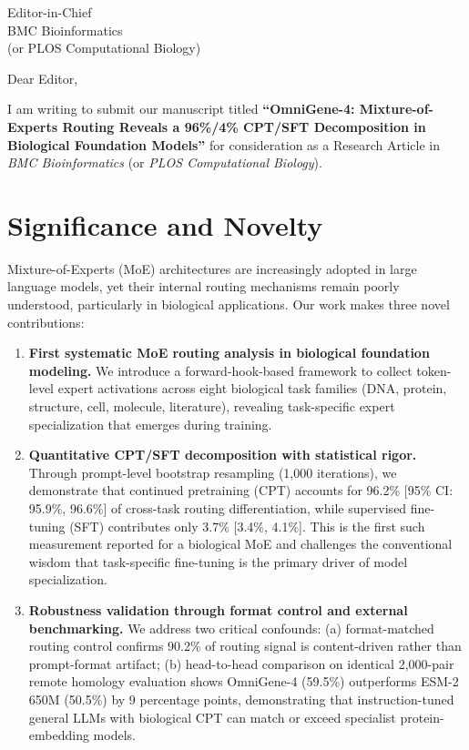 \documentclass[11pt]{letter}
\begin{document}
\begin{letter}{Editor-in-Chief\\
BMC Bioinformatics\\
(or PLOS Computational Biology)}

\opening{Dear Editor,}

I am writing to submit our manuscript titled \textbf{``OmniGene-4: Mixture-of-Experts Routing Reveals a 96\%/4\% CPT/SFT Decomposition in Biological Foundation Models''} for consideration as a Research Article in \emph{BMC Bioinformatics} (or \emph{PLOS Computational Biology}).

\section*{Significance and Novelty}

Mixture-of-Experts (MoE) architectures are increasingly adopted in large language models, yet their internal routing mechanisms remain poorly understood, particularly in biological applications. Our work makes three novel contributions:

\begin{enumerate}
\item \textbf{First systematic MoE routing analysis in biological foundation modeling.} We introduce a forward-hook-based framework to collect token-level expert activations across eight biological task families (DNA, protein, structure, cell, molecule, literature), revealing task-specific expert specialization that emerges during training.

\item \textbf{Quantitative CPT/SFT decomposition with statistical rigor.} Through prompt-level bootstrap resampling (1,000 iterations), we demonstrate that continued pretraining (CPT) accounts for 96.2\% [95\% CI: 95.9\%, 96.6\%] of cross-task routing differentiation, while supervised fine-tuning (SFT) contributes only 3.7\% [3.4\%, 4.1\%]. This is the first such measurement reported for a biological MoE and challenges the conventional wisdom that task-specific fine-tuning is the primary driver of model specialization.

\item \textbf{Robustness validation through format control and external benchmarking.} We address two critical confounds: (a) format-matched routing control confirms 90.2\% of routing signal is content-driven rather than prompt-format artifact; (b) head-to-head comparison on identical 2,000-pair remote homology evaluation shows OmniGene-4 (59.5\%) outperforms ESM-2 650M (50.5\%) by 9 percentage points, demonstrating that instruction-tuned general LLMs with biological CPT can match or exceed specialist protein-embedding models.
\end{enumerate}


\end{letter}
\end{document}
